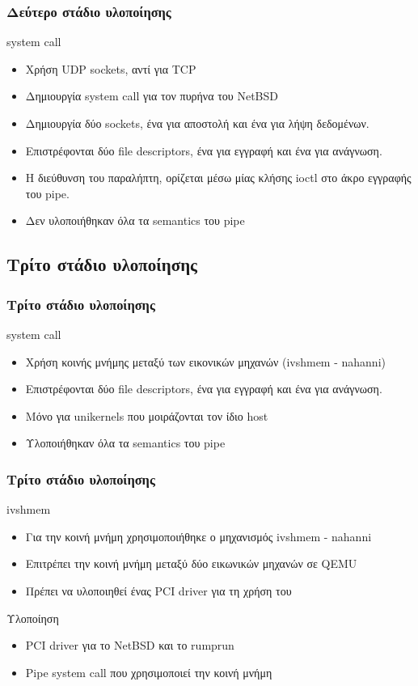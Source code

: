 \documentclass[red,slidestop,notes,compress,mathserif]{beamer}
\begin{document}
\begin{frame}
\frametitle{Δεύτερο στάδιο υλοποίησης}
\begin{block}{system call}
\begin{itemize}
\item Χρήση UDP sockets, αντί για TCP
\item Δημιουργία system call για τον πυρήνα του NetBSD
\item Δημιουργία δύο sockets, ένα για αποστολή και ένα για λήψη δεδομένων.
\item Επιστρέφονται δύο file descriptors, ένα για εγγραφή και ένα για ανάγνωση.
\item Η διεύθυνση του παραλήπτη, ορίζεται μέσω μίας κλήσης ioctl στο άκρο εγγραφής του pipe.
\item Δεν υλοποιήθηκαν όλα τα semantics του pipe 
\end{itemize}
\end{block}
\end{frame}

\subsection{Τρίτο στάδιο υλοποίησης}
\begin{frame}
\frametitle{Τρίτο στάδιο υλοποίησης}
\begin{block}{system call}
\begin{itemize}
\item Χρήση κοινής μνήμης μεταξύ των εικονικών μηχανών (ivshmem - nahanni)
\item Επιστρέφονται δύο file descriptors, ένα για εγγραφή και ένα για ανάγνωση.
\item Μόνο για unikernels που μοιράζονται τον ίδιο host
\item Υλοποιήθηκαν όλα τα semantics του pipe 
\end{itemize}
\end{block}
\end{frame}

\begin{frame}
\frametitle{Τρίτο στάδιο υλοποίησης}
\begin{block}{ivshmem}
\begin{itemize}
\item Για την κοινή μνήμη χρησιμοποιήθηκε ο μηχανισμός ivshmem - nahanni
\item Επιτρέπει την κοινή μνήμη μεταξύ δύο εικωνικών μηχανών σε QEMU
\item Πρέπει να υλοποιηθεί ένας PCI driver για τη χρήση του
\end{itemize}
\end{block}
\begin{block}{Υλοποίηση}
\begin{itemize}
\item PCI driver για το NetBSD και το rumprun
\item Pipe system call που χρησιμοποιεί την κοινή μνήμη
\end{itemize}
\end{block}
\end{frame}
\end{document}
